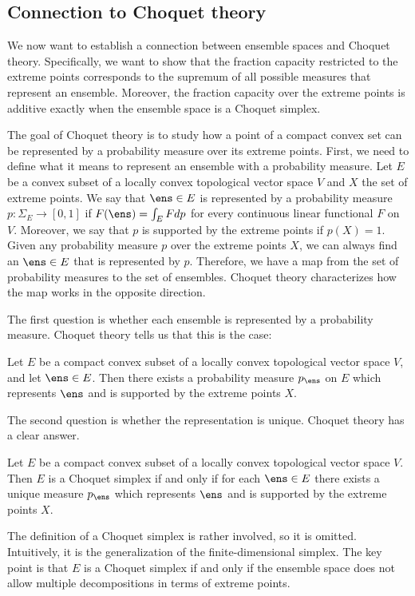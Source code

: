 \subsection{Connection to Choquet theory}

We now want to establish a connection between ensemble spaces and Choquet theory. Specifically, we want to show that the fraction capacity restricted to the extreme points corresponds to the supremum of all possible measures that represent an ensemble. Moreover, the fraction capacity over the extreme points is additive exactly when the ensemble space is a Choquet simplex.

The goal of Choquet theory is to study how a point of a compact convex set can be represented by a probability measure over its extreme points. First, we need to define what it means to represent an ensemble with a probability measure. Let $E$ be a convex subset of a locally convex topological vector space $V$ and $X$ the set of extreme points. We say that $\ens \in E$ is represented by a probability measure $p : \Sigma_{E} \to [0,1]$ if $F(\ens) = \int_E F dp$ for every continuous linear functional $F$ on $V$. Moreover, we say that $p$ is supported by the extreme points if $p(X) = 1$. Given any probability measure $p$ over the extreme points $X$, we can always find an $\ens \in E$ that is represented by $p$. Therefore, we have a map from the set of probability measures to the set of ensembles. Choquet theory characterizes how the map works in the opposite direction.

The first question is whether each ensemble is represented by a probability measure. Choquet theory tells us that this is the case:
\begin{mathSection}
\begin{thrm}\label{pm-es-ChoquetExistence}
	Let $E$ be a compact convex subset of a locally convex topological vector space $V$, and let $\ens \in E$. Then there exists a probability measure $p_{\ens}$ on $E$ which represents $\ens$ and is supported by the extreme points $X$.
\end{thrm}
\end{mathSection}
The second question is whether the representation is unique. Choquet theory has a clear answer.
\begin{mathSection}
\begin{thrm}\label{pm-es-ChoquetUniqueness}
	Let $E$ be a compact convex subset of a locally convex topological vector space $V$. Then $E$ is a Choquet simplex if and only if for each $\ens \in E$ there exists a unique measure $p_{\ens}$ which represents $\ens$ and is supported by the extreme points $X$.
\end{thrm}
\end{mathSection}
The definition of a Choquet simplex is rather involved, so it is omitted. Intuitively, it is the generalization of the finite-dimensional simplex. The key point is that $E$ is a Choquet simplex if and only if the ensemble space does not allow multiple decompositions in terms of extreme points.

